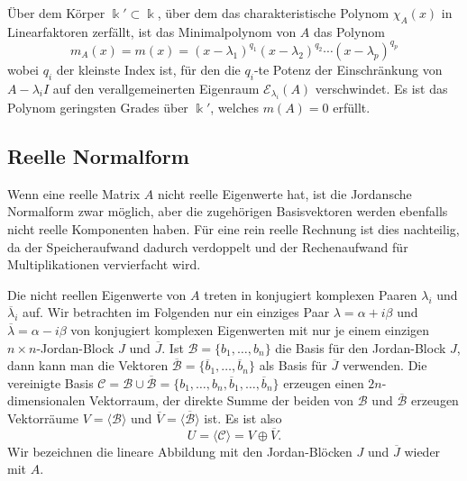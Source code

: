 \begin{satz}[Minimalpolynom]
Über dem Körper $\Bbbk'\subset\Bbbk$, über dem das charakteristische
Polynom $\chi_A(x)$ in Linearfaktoren zerfällt, ist das Minimalpolynom
von $A$ das Polynom
\[
m_A(x)
=
m(x)
=
(x-\lambda_1)^{q_1}
(x-\lambda_2)^{q_2}
\cdots
(x-\lambda_p)^{q_p}
\]
wobei $q_i$ der kleinste Index ist, für den die $q_i$-te Potenz
der Einschränkung von $A-\lambda_i I$ auf den verallgemeinerten Eigenraum
$\mathcal{E}_{\lambda_i}(A)$ verschwindet.
Es ist das Polynom geringsten Grades über $\Bbbk'$, welches $m(A)=0$ erfüllt.
\end{satz}


\subsection{Reelle Normalform
\label{buch:subsection:reelle-normalform}}
Wenn eine reelle Matrix $A$ nicht reelle Eigenwerte hat, ist die Jordansche
Normalform zwar möglich, aber die zugehörigen Basisvektoren werden ebenfalls
nicht reelle Komponenten haben.
Für eine rein reelle Rechnung ist dies nachteilig, da der Speicheraufwand
dadurch verdoppelt und der Rechenaufwand für Multiplikationen vervierfacht
wird.

Die nicht reellen Eigenwerte von $A$ treten in konjugiert komplexen Paaren
$\lambda_i$ und $\overline{\lambda}_i$ auf.
Wir betrachten im Folgenden nur ein einziges Paar $\lambda=\alpha+i\beta$ und
$\overline{\lambda}=\alpha-i\beta$ von konjugiert komplexen Eigenwerten mit
nur je einem einzigen $n\times n$-Jordan-Block $J$ und $\overline{J}$.
Ist $\mathcal{B}=\{b_1,\dots,b_n\}$ die Basis für den Jordan-Block $J$,
dann kann man die Vektoren
$\overline{\mathcal{B}}=\{\overline{b}_1,\dots,\overline{b}_n\}$ als Basis für
$\overline{J}$ verwenden.
Die vereinigte Basis
$\mathcal{C} = \mathcal{B}\cup\overline{\mathcal{B}}
= \{b_1,\dots,b_n,\overline{b}_1,\dots,\overline{b}_n\}$
erzeugen einen $2n$-dimensionalen Vektorraum,
der direkte Summe der beiden von $\mathcal{B}$ und $\overline{\mathcal{B}}$
erzeugen Vektorräume $V=\langle\mathcal{B}\rangle$ und
$\overline{V}=\langle\overline{\mathcal{B}}\rangle$ ist.
Es ist also
\[
U=\langle \mathcal{C}\rangle
=
V\oplus \overline{V}.
\]
Wir bezeichnen die lineare Abbildung mit den Jordan-Blöcken
$J$ und $\overline{J}$ wieder mit $A$.


